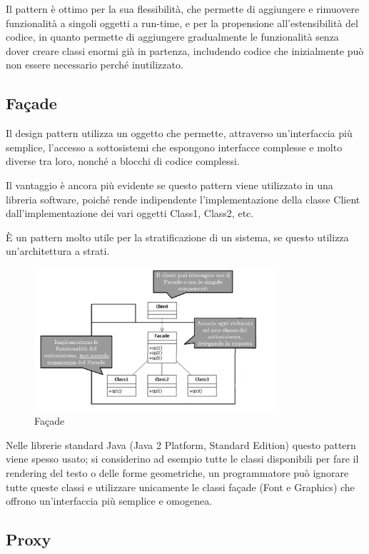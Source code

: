 Il pattern è ottimo per la sua flessibilità, che permette di aggiungere e rimuovere funzionalità a singoli oggetti a run-time, e per la propensione all'estensibilità del codice, in quanto permette di aggiungere gradualmente le funzionalità senza dover creare classi enormi già in partenza, includendo codice che inizialmente può non essere necessario perché inutilizzato.

\subsection{Façade}
Il design pattern utilizza un oggetto che permette, attraverso un'interfaccia più semplice, l'accesso a sottosistemi che espongono interfacce complesse e molto diverse tra loro, nonché a blocchi di codice complessi.

Il vantaggio è ancora più evidente se questo pattern viene utilizzato in una libreria software, poiché rende indipendente l'implementazione della classe Client dall'implementazione dei vari oggetti Class1, Class2, etc.

\`E un pattern molto utile per la stratificazione di un sistema, se questo utilizza un'architettura a strati.

\begin{figure}[H]
\includegraphics[width=0.8\textwidth]{res/img/DP/facade}
\caption{Façade}
\end{figure}

Nelle librerie standard Java (Java 2 Platform, Standard Edition) questo pattern viene spesso usato; si considerino ad esempio tutte le classi disponibili per fare il rendering del testo o delle forme geometriche, un programmatore può ignorare tutte queste classi e utilizzare unicamente le classi façade (Font e Graphics) che offrono un'interfaccia più semplice e omogenea.

\subsection{Proxy}\label{proxy}

